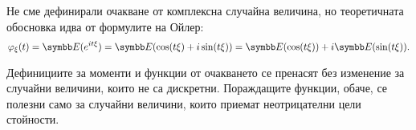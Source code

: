 \documentclass[numbers=endperiod, bibliography=totocnumbered]{scrartcl}
\begin{document}
\begin{remark}
  Не сме дефинирали очакване от комплексна случайна величина, но теоретичната обосновка идва от формулите на Ойлер:
  \begin{equation*}
    \Char_\xi (t)
    =
    \Expect(e^{it\xi})
    =
    \Expect(\cos(t\xi) + i\sin(t\xi))
    =
    \Expect(\cos(t\xi)) + i \Expect(\sin(t\xi)).
  \end{equation*}
\end{remark}

\begin{remark}
  Дефинициите за моменти и функции от очакването се пренасят без изменение за случайни величини, които не са дискретни. Пораждащите функции, обаче, се полезни само за случайни величини, които приемат неотрицателни цели стойности.
\end{remark}
\end{document}
